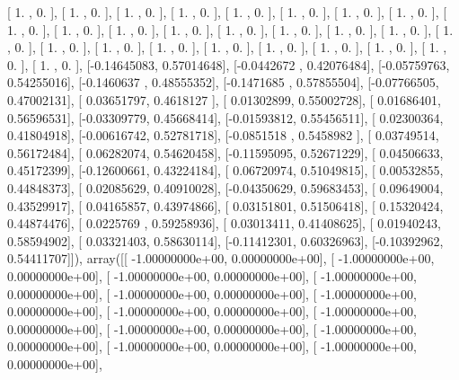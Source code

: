 \documentclass{article}
\begin{document}
       [ 1.        ,  0.        ],
       [ 1.        ,  0.        ],
       [ 1.        ,  0.        ],
       [ 1.        ,  0.        ],
       [ 1.        ,  0.        ],
       [ 1.        ,  0.        ],
       [ 1.        ,  0.        ],
       [ 1.        ,  0.        ],
       [ 1.        ,  0.        ],
       [ 1.        ,  0.        ],
       [ 1.        ,  0.        ],
       [ 1.        ,  0.        ],
       [ 1.        ,  0.        ],
       [ 1.        ,  0.        ],
       [ 1.        ,  0.        ],
       [ 1.        ,  0.        ],
       [ 1.        ,  0.        ],
       [ 1.        ,  0.        ],
       [ 1.        ,  0.        ],
       [ 1.        ,  0.        ],
       [ 1.        ,  0.        ],
       [ 1.        ,  0.        ],
       [ 1.        ,  0.        ],
       [ 1.        ,  0.        ],
       [ 1.        ,  0.        ],
       [ 1.        ,  0.        ],
       [-0.14645083,  0.57014648],
       [-0.0442672 ,  0.42076484],
       [-0.05759763,  0.54255016],
       [-0.1460637 ,  0.48555352],
       [-0.1471685 ,  0.57855504],
       [-0.07766505,  0.47002131],
       [ 0.03651797,  0.4618127 ],
       [ 0.01302899,  0.55002728],
       [ 0.01686401,  0.56596531],
       [-0.03309779,  0.45668414],
       [-0.01593812,  0.55456511],
       [ 0.02300364,  0.41804918],
       [-0.00616742,  0.52781718],
       [-0.0851518 ,  0.5458982 ],
       [ 0.03749514,  0.56172484],
       [ 0.06282074,  0.54620458],
       [-0.11595095,  0.52671229],
       [ 0.04506633,  0.45172399],
       [-0.12600661,  0.43224184],
       [ 0.06720974,  0.51049815],
       [ 0.00532855,  0.44848373],
       [ 0.02085629,  0.40910028],
       [-0.04350629,  0.59683453],
       [ 0.09649004,  0.43529917],
       [ 0.04165857,  0.43974866],
       [ 0.03151801,  0.51506418],
       [ 0.15320424,  0.44874476],
       [ 0.0225769 ,  0.59258936],
       [ 0.03013411,  0.41408625],
       [ 0.01940243,  0.58594902],
       [ 0.03321403,  0.58630114],
       [-0.11412301,  0.60326963],
       [-0.10392962,  0.54411707]]), array([[ -1.00000000e+00,   0.00000000e+00],
       [ -1.00000000e+00,   0.00000000e+00],
       [ -1.00000000e+00,   0.00000000e+00],
       [ -1.00000000e+00,   0.00000000e+00],
       [ -1.00000000e+00,   0.00000000e+00],
       [ -1.00000000e+00,   0.00000000e+00],
       [ -1.00000000e+00,   0.00000000e+00],
       [ -1.00000000e+00,   0.00000000e+00],
       [ -1.00000000e+00,   0.00000000e+00],
       [ -1.00000000e+00,   0.00000000e+00],
       [ -1.00000000e+00,   0.00000000e+00],
       [ -1.00000000e+00,   0.00000000e+00],
\end{document}
